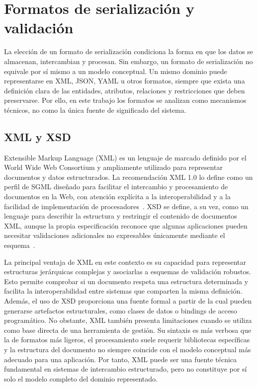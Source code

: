 \section{Formatos de serialización y validación}
\label{sec:estado_arte_serializacion}

La elección de un formato de serialización condiciona la forma en que los datos se
almacenan, intercambian y procesan. Sin embargo, un formato de serialización no
equivale por sí mismo a un modelo conceptual. Un mismo dominio puede representarse
en XML, JSON, YAML u otros formatos, siempre que exista una definición clara de
las entidades, atributos, relaciones y restricciones que deben preservarse. Por
ello, en este trabajo los formatos se analizan como mecanismos técnicos, no como
la única fuente de significado del sistema.

\subsection{XML y XSD}
\label{subsec:estado_arte_xml_xsd}

Extensible Markup Language (XML) es un lenguaje de marcado definido por el World
Wide Web Consortium y ampliamente utilizado para representar documentos y datos
estructurados. La recomendación XML 1.0 lo define como un perfil de SGML diseñado
para facilitar el intercambio y procesamiento de documentos en la Web, con
atención explícita a la interoperabilidad y a la facilidad de implementación de
procesadores~\cite{w3c_xml_10}. XSD se define, a su vez, como un lenguaje para
describir la estructura y restringir el contenido de documentos XML, aunque la
propia especificación reconoce que algunas aplicaciones pueden necesitar
validaciones adicionales no expresables únicamente mediante el
esquema~\cite{w3c_xsd_11}.

La principal ventaja de XML en este contexto es su capacidad para representar
estructuras jerárquicas complejas y asociarlas a esquemas de validación robustos.
Esto permite comprobar si un documento respeta una estructura determinada y
facilita la interoperabilidad entre sistemas que comparten la misma definición.
Además, el uso de XSD proporciona una fuente formal a partir de la cual pueden
generarse artefactos estructurales, como clases de datos o bindings de acceso
programático. No obstante, XML también presenta limitaciones cuando se utiliza como base directa
de una herramienta de gestión. Su sintaxis es más verbosa que la de formatos más
ligeros, el procesamiento suele requerir bibliotecas específicas y la estructura
del documento no siempre coincide con el modelo conceptual más adecuado para una
aplicación. Por tanto, XML puede ser una fuente técnica fundamental en sistemas de
intercambio estructurado, pero no constituye por sí solo el modelo completo del
dominio representado.

